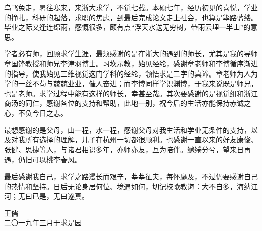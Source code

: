 \begin{thanks}

乌飞兔走，暑往寒来，来浙大求学，不觉七载。本硕七年，经历初见的喜悦，学业的挣扎，科研的起落，求职的焦虑，到最后完成论文走上社会，也算是筚路蓝缕。毕业之际又逢连绵雨，感慨很多，颇有点“浮天水送无穷树，带雨云埋一半山”的意思。

学者必有师，回顾求学生涯，最须感谢的是在浙大的遇到的师长，尤其是我的导师章国锋教授和师兄李津羽博士。习坎示教，始见经纶，感谢章老师和李博循序渐进的指导，使我始见三维视觉这门学科的经纶，领悟求是二字的真谛。章老师为人为学的一丝不苟与兢兢业业，催人奋进；而李博同样学识渊博，于我来说既是师兄，也是老师。求学过程中能有这样的师长，幸甚至哉。其次要感谢的是视觉组和浙江商汤的同仁，感谢各位的支持和帮助，此地一别，祝今后的生活亦能保持赤诚之心，不负今日之志。

最想感谢的是父母，山一程，水一程，感谢父母对我生活和学业无条件的支持，以及对我所有选择的理解，儿子在杭州一切都很顺利。也感谢一直以来的好友康俊、张健、思捷等人，与诸君相识多年，亦师亦友，互为陪伴。缱绻分兮，望来日再遇，仍旧可以桃李春风。

最后感谢我自己，求学之路漫长而艰辛，莘莘征夫，每怀靡及，不过仍要感谢自己的热情和坚持。日后无论身居何位、境遇如何，切记校歌教诲：大不自多，海纳江河；无曰已是，无曰遂真。

\vspace*{\fill}
\begin{flushright}
    王儒 \\
    二〇一九年三月于求是园
\end{flushright}

\end{thanks}
